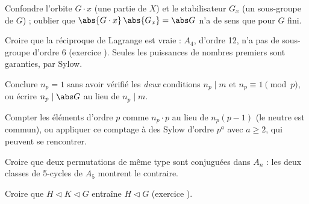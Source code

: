 \begin{erreurs}
\item Confondre l'orbite $G\cdot x$ (une partie de $X$) et le stabilisateur $G_x$ (un sous-groupe de $G$) ; oublier que $\abs{G\cdot x}\,\abs{G_x}=\abs G$ n'a de sens que pour $G$ fini.
\item Croire que la réciproque de Lagrange est vraie : $A_4$, d'ordre 12, n'a pas de sous-groupe d'ordre 6 (exercice ). Seules les puissances de nombres premiers sont garanties, par Sylow.
\item Conclure $n_p=1$ sans avoir vérifié les \emph{deux} conditions $n_p\mid m$ et $n_p\equiv1\pmod p$, ou écrire $n_p\mid\abs G$ au lieu de $n_p\mid m$.
\item Compter les éléments d'ordre $p$ comme $n_p\cdot p$ au lieu de $n_p(p-1)$ (le neutre est commun), ou appliquer ce comptage à des Sylow d'ordre $p^a$ avec $a\ge2$, qui peuvent se rencontrer.
\item Croire que deux permutations de même type sont conjuguées dans $A_n$ : les deux classes de 5-cycles de $A_5$ montrent le contraire.
\item Croire que $H\lhd K\lhd G$ entraîne $H\lhd G$ (exercice ).
\end{erreurs}

\exercices


